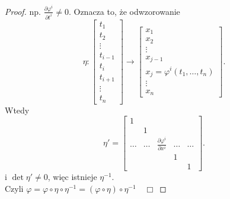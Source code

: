 \documentclass[../main.tex]{subfiles}
\begin{document}
\begin{proof}
        np. $\frac{\partial \varphi^i}{\partial t^i} \neq 0$. Oznacza to, że odwzorowanie
        \[
            \eta : \begin{bmatrix} t_1 \\ t_2 \\ \vdots \\ t_{i-1} \\t_i \\ t_{i+1} \\ \vdots \\ t_n \end{bmatrix} \to \begin{bmatrix} x_1\\ x_2 \\ \vdots \\ x_{j-1} \\ x_j = \varphi^i (t_1,\ldots,t_n) \\ \vdots \\ x_n \end{bmatrix}
        .\]
        Wtedy
        \[
            \eta' = \begin{bmatrix} 1&&&&\\ &1&&& \\ \ldots&\ldots& \frac{\partial \varphi^i}{\partial x^i} &\ldots&\ldots \\ &&&1& \\ &&&&1\end{bmatrix}
        .\]
        i $\det \eta' \neq 0$, więc istnieje $\eta^{-1}$. \\
        Czyli $\varphi = \varphi \circ \eta \circ \eta^{-1} = (\varphi \circ \eta ) \circ \eta^{-1} \quad\Box$
    \end{proof}
\end{document}
